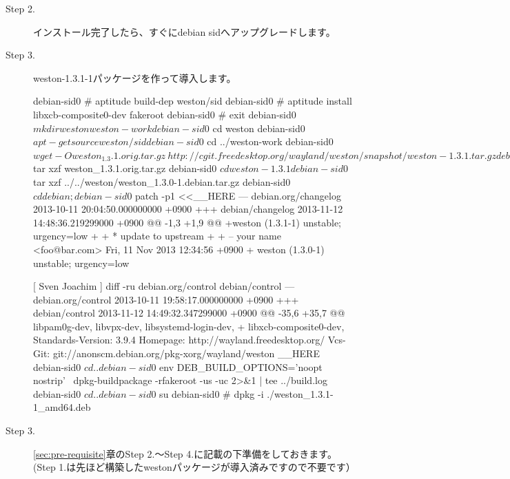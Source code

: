 \documentclass[mingoth,a4paper]{jsarticle}
\begin{document}
\begin{description}
\item [Step 2.] インストール完了したら、すぐにdebian sidへアップグレードします。


\item [Step 3.] weston-1.3.1-1パッケージを作って導入します。

\begin{commandline}
debian-sid0 # aptitude build-dep weston/sid
debian-sid0 # aptitude install libxcb-composite0-dev fakeroot
debian-sid0 # exit
debian-sid0 $ mkdir weston weston-work
debian-sid0 $ cd weston
debian-sid0 $ apt-get source weston/sid
debian-sid0 $ cd ../weston-work
debian-sid0 $ wget -O weston_1.3.1.orig.tar.gz \
  http://cgit.freedesktop.org/wayland/weston/snapshot/weston-1.3.1.tar.gz
debian-sid0 $ tar xzf weston_1.3.1.orig.tar.gz
debian-sid0 $ cd weston-1.3.1
debian-sid0 $ tar xzf ../../weston/weston_1.3.0-1.debian.tar.gz
debian-sid0 $ cd debian;
debian-sid0 $ patch -p1 <<__HERE
--- debian.org/changelog        2013-10-11 20:04:50.000000000 +0900
+++ debian/changelog    2013-11-12 14:48:36.219299000 +0900
@@ -1,3 +1,9 @@
+weston (1.3.1-1) unstable; urgency=low
+
+  * update to upstream
+
+ -- your name <foo@bar.com>  Fri, 11 Nov 2013 12:34:56 +0900
+
 weston (1.3.0-1) unstable; urgency=low

   [ Sven Joachim ]
diff -ru debian.org/control debian/control
--- debian.org/control  2013-10-11 19:58:17.000000000 +0900
+++ debian/control      2013-11-12 14:49:32.347299000 +0900
@@ -35,6 +35,7 @@
  libpam0g-dev,
  libvpx-dev,
  libsystemd-login-dev,
+ libxcb-composite0-dev,
 Standards-Version: 3.9.4
 Homepage: http://wayland.freedesktop.org/
 Vcs-Git: git://anonscm.debian.org/pkg-xorg/wayland/weston
__HERE
debian-sid0 $ cd ..
debian-sid0 $ env DEB_BUILD_OPTIONS='noopt nostrip' \
   dpkg-buildpackage -rfakeroot -us -uc 2>&1 | tee ../build.log
debian-sid0 $ cd ..
debian-sid0 $ su
debian-sid0 # dpkg -i ./weston_1.3.1-1_amd64.deb
\end{commandline}

\item [Step 3.]  \ref{sec:pre-requisite}章のStep 2.〜Step 4.に記載の下準備をしておきます。(Step 1.は先ほど構築したwestonパッケージが導入済みですので不要です）



\end{description}
\end{document}
